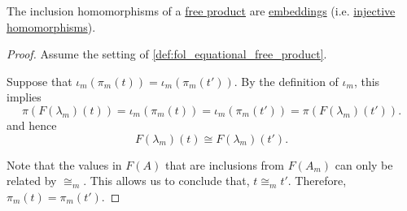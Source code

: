 \begin{proposition}\label{thm:fol_free_product_inclusion_is_injective}
  The inclusion homomorphisms of a \hyperref[def:fol_equational_free_product]{free product} are \hyperref[def:fol_embedding]{embeddings} (i.e. \hyperref[def:function_invertibility/injective]{injective} \hyperref[def:fol_homomorphism]{homomorphisms}).
\end{proposition}
\begin{proof}
  Assume the setting of \cref{def:fol_equational_free_product}.

  Suppose that \( \iota_m(\pi_m(t)) = \iota_m(\pi_m(t')) \). By the definition of \( \iota_m \), this implies
  \begin{equation*}
    \pi(F(\lambda_m)(t)) = \iota_m(\pi_m(t)) = \iota_m(\pi_m(t')) = \pi(F(\lambda_m)(t')).
  \end{equation*}
  and hence
  \begin{equation*}
    F(\lambda_m)(t) \cong F(\lambda_m)(t').
  \end{equation*}

  Note that the values in \( F(A) \) that are inclusions from \( F(A_m) \) can only be related by \( {\cong_m} \). This allows us to conclude that, \( t \cong_m t' \). Therefore, \( \pi_m(t) = \pi_m(t') \).
\end{proof}

